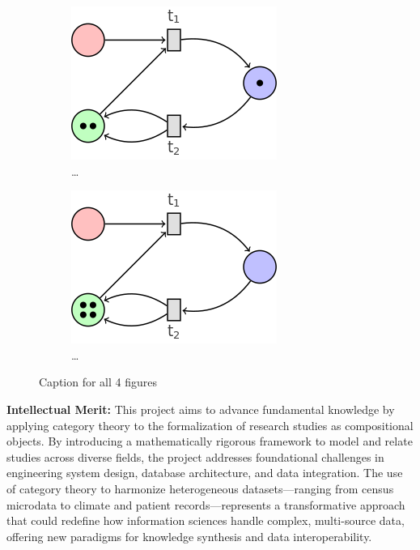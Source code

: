 \documentclass[11pt]{extarticle}
\begin{document}
\begin{figure}[!h]
 \medskip
 \begin{subfigure}{0.4\textwidth}
     \includegraphics[width=\textwidth]{marking_3}
     \caption{\dots}
     \label{fig:c}
 \end{subfigure}
 \hfill
 \begin{subfigure}{0.4\textwidth}
     \includegraphics[width=\textwidth]{marking_4}
     \caption{\dots}
     \label{fig:d}
 \end{subfigure}

 \caption{Caption for all 4 figures}
 \label{Label}

\end{figure}

\textbf{Intellectual Merit:} This project aims to advance fundamental knowledge by applying category theory to the formalization of research studies as compositional objects. 
By introducing a mathematically rigorous framework to model and relate studies across diverse fields, the project addresses foundational challenges in engineering system design, database architecture, and data integration. 
The use of category theory to harmonize heterogeneous datasets—ranging from census microdata to climate and patient records—represents a transformative approach that could redefine how information sciences handle complex, multi-source data, offering new paradigms for knowledge synthesis and data interoperability.
\end{document}
